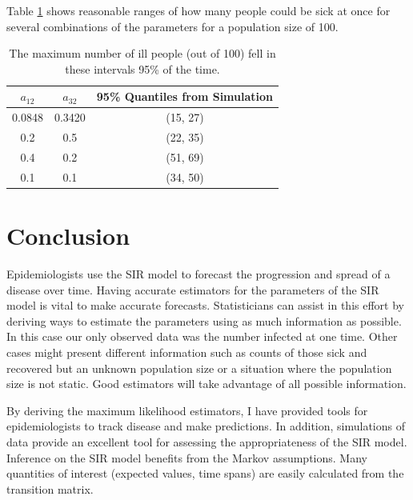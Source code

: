 \documentclass{svproc}
\begin{document}
Table \ref{tab3} shows reasonable ranges of how many people could be sick at once for several combinations of the parameters for a population size of 100. 
\begin{table}
\centering
\setlength{\tabcolsep}{5pt}
\begin{tabular}{|c|c|c|}

\hline
$a_{12}$ & $a_{32}$ & 95\% Quantiles from Simulation \\ \hline
0.0848 & 0.3420 & (15, 27) \\ \hline
0.2 & 0.5 & (22, 35) \\ \hline
0.4 & 0.2 & (51, 69) \\ \hline
0.1 & 0.1 & (34, 50) \\ \hline

\end{tabular}
\caption{The maximum number of ill people (out of 100) fell in these intervals 95\% of the time.}
\label{tab3}
\end{table}

\section{Conclusion}
Epidemiologists use the SIR model to forecast the progression and spread of a disease over time. Having accurate estimators for the parameters of the SIR model is vital to make accurate forecasts. Statisticians can assist in this effort by deriving ways to estimate the parameters using as much information as possible. In this case our only observed data was the number infected at one time. Other cases might present different information such as counts of those sick and recovered but an unknown population size or a situation where the population size is not static. Good estimators will take advantage of all possible information. 

By deriving the maximum likelihood estimators, I have provided tools for epidemiologists to track disease and make predictions. In addition, simulations of data provide an excellent tool for assessing the appropriateness of the SIR model. Inference on the SIR model benefits from the Markov assumptions. Many quantities of interest (expected values, time spans) are easily calculated from the transition matrix. 

\nocite{*}


\end{document}
